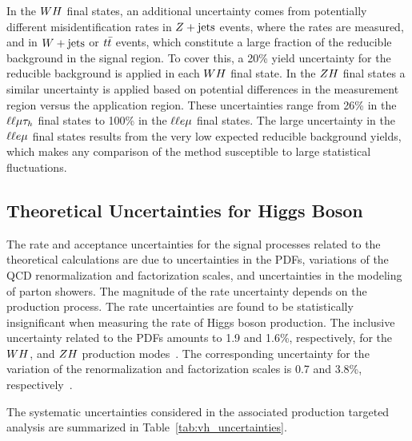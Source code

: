 In the $WH$ final states, an 
additional uncertainty comes from potentially different misidentification rates 
in $Z+\textrm{jets}$ events, where the rates are measured, and in $W+\textrm{jets}$ or 
$t\bar{t}$ events, which constitute a large fraction of the reducible background 
in the signal region. To cover this, a 20\% yield uncertainty for the reducible 
background is applied in each $WH$ final state. In the $ZH$ final
states a similar uncertainty is applied based on potential differences in the
measurement region versus the application region. These uncertainties
range from 26\% in the $\ell\ell\mu\tau_{h}$ final states to 100\% in the
$\ell\ell e\mu$ final states. The large uncertainty in the $\ell\ell e\mu$ 
final states results from the very low expected reducible background yields, 
which makes any comparison of the method susceptible to large statistical fluctuations.


\subsection{Theoretical Uncertainties for Higgs Boson}
The rate and acceptance uncertainties for the signal processes related to the 
theoretical calculations are due to uncertainties in the PDFs, variations of 
the QCD renormalization and factorization scales, and uncertainties in the 
modeling of parton showers. 
The magnitude of the rate uncertainty depends on the production process.
The rate uncertainties are found to be statistically insignificant when
measuring the rate of Higgs boson production.
The inclusive uncertainty related to the PDFs amounts to 1.9 and 1.6\%, 
respectively, for the $WH$, and $ZH$ production modes~\cite{deFlorian:2016spz}. The
corresponding uncertainty for the variation of the renormalization and 
factorization scales is 0.7 and 3.8\%, respectively~\cite{deFlorian:2016spz}.

The systematic uncertainties considered in the associated production
targeted analysis are summarized in Table~\ref{tab:vh_uncertainties}.


